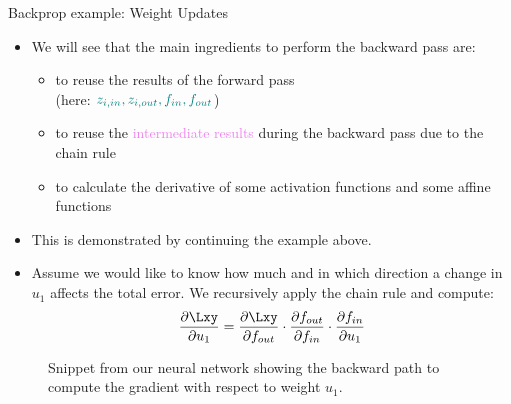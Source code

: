   \begin{vbframe}{Backprop example: Weight Updates}

  \begin{itemize}
    \item We will see that the main ingredients to perform the backward pass are: 
    \begin{itemize}
      \item to reuse the results of the forward pass \\ (here:  $\textcolor{teal}{z_{i, in}, z_{i, out}, f_{in},f_{out}}$)
      \item to reuse the \textcolor{violet}{intermediate results} during the backward pass due to the chain rule 
      \item to calculate the derivative of some activation functions and some affine functions
    \end{itemize}
    \item This is demonstrated by continuing the example above.
      \end{itemize}
\framebreak
  \begin{itemize}
    \item Assume we would like to know how much and in which direction a change in $u_1$ affects the total error. We recursively apply the chain rule and compute: $$\frac{\partial \Lxy}{\partial u_1} = \frac{\partial \Lxy}{\partial f_{out}} \cdot \frac{\partial f_{out}}{\partial f_{in}} \cdot \frac{\partial f_{in}}{\partial u_1}$$
  \end{itemize}
  \begin{figure}
    \centering
      \caption{\footnotesize{Snippet from our neural network showing the backward path to compute the gradient with respect to weight $u_1$.}}

\end{figure}
\end{vbframe}
